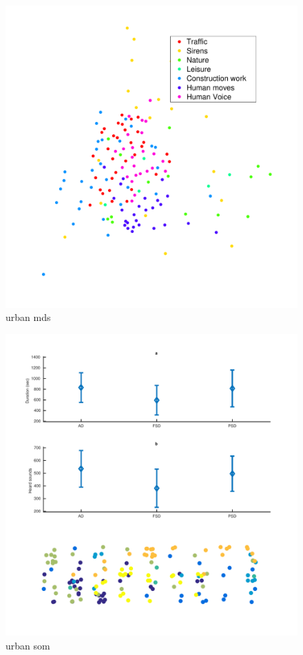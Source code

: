 \documentclass[12pt,a4paper,fleqn]{tufte-handout}
\begin{document}
 \begin{figure}
  \begin{center}
  \includegraphics[scale=.5]{figures/urban_mds}
  \caption{urban mds}
  \end{center}
  \end{figure}

 \begin{figure}
  \begin{center}
  \includegraphics[scale=.5]{figures/urban_som}
  \caption{urban som}
  \end{center}
  \end{figure}
  
\end{document}
